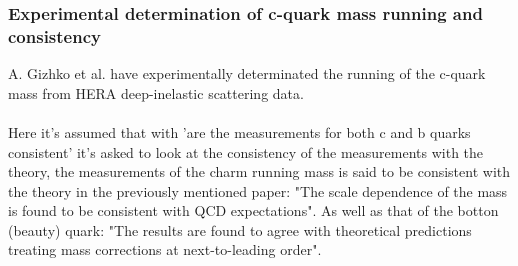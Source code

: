 \documentclass[10pt,a4paper,twoside]{article}
\begin{document}
\subsubsection*{Experimental determination of c-quark mass running and consistency}
A. Gizhko et al. have experimentally determinated the running of the c-quark mass from HERA deep-inelastic scattering data\cite{RunningCQuarkMass}.\\\\Here it's assumed that with 'are the measurements for both c and b quarks consistent' it's asked to look at the consistency of the measurements with the theory, the measurements of the charm running mass is said to be consistent with the theory in the previously mentioned paper: "The scale dependence of the mass is found to be consistent with QCD expectations". As well as that of the botton (beauty) quark: "The results are found to agree with theoretical predictions treating mass corrections at next-to-leading order"\cite{Abdallah}.


\end{document}
